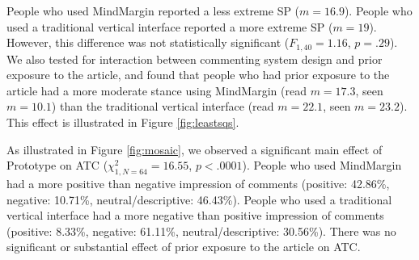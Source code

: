 People who used MindMargin reported a less extreme SP ($m=16.9$). People who used a traditional vertical interface reported a more extreme SP ($m=19$). However, this difference was not statistically significant ($F_{1,40}=1.16$, $p=.29$). We also tested for interaction between commenting system design and prior exposure to the article, and found that people who had prior exposure to the article had a more moderate stance using MindMargin (read $m=17.3$, seen $m=10.1$) than the traditional vertical interface (read $m=22.1$, seen $m=23.2$). This effect is illustrated in Figure \ref{fig:leastsqs}. 




As illustrated in Figure \ref{fig:mosaic}, we observed a significant main effect of Prototype on ATC ($\chi^2_{1,N=64}=16.55$, $p<.0001$).
People who used MindMargin had a more positive than negative impression of comments (positive: 42.86\%, negative: 10.71\%, neutral/descriptive: 46.43\%). People who used a traditional vertical interface had a more negative than positive impression of comments (positive: 8.33\%, negative: 61.11\%, neutral/descriptive: 30.56\%). There was no significant or substantial effect of prior exposure to the article on ATC.  %

